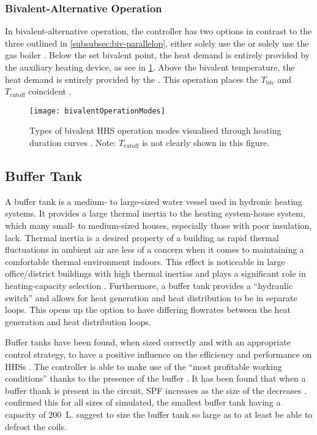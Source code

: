 \subsubsection{Bivalent-Alternative Operation}
In bivalent-alternative operation, the controller has two options in contrast to the three outlined in \cref{subsubsec:biv-parallelop}, either solely use the \HP or solely use the gas boiler \cite{buday_2014}. Below the set bivalent point, the heat demand is entirely provided by the auxiliary heating device, as see in \cref{fig:bivalentOperationModes}. Above the bivalent temperature, the heat demand is entirely provided by the \HP. This operation places the $T_\text{biv}$ and $T_\text{cutoff}$ coincident \cite{buday_2014,klein_numerical_2014}. 

\begin{figure}[htb]
    \centering
    \texttt{[image: bivalentOperationModes]}
    \caption[Bivalent operation modes]{Types of bivalent \ac{HHS} operation modes visualised through heating duration curves \cite{buday_2014}. Note: $T_\text{cutoff}$ is not clearly shown in this figure.}
    \label{fig:bivalentOperationModes}
\end{figure}

\subsection{Buffer Tank} 
A buffer tank is a medium- to large-sized water vessel used in hydronic heating systems. It provides a large thermal inertia to the heating system-house system, which many small- to medium-sized houses, especially those with poor insulation, lack. Thermal inertia is a desired property of a building as rapid thermal fluctuations in ambient air are less of a concern when it comes to maintaining a comfortable thermal environment indoors. This effect is noticeable in large office/district buildings with high thermal inertias and plays a significant role in heating-capacity selection \cite{owen_ashrae_2009}. Furthermore, a buffer tank provides a ``hydraulic switch'' and allows for heat generation and heat distribution to be in separate loops. This opens up the option to have differing flowrates between the heat generation and heat distribution loops. 

Buffer tanks have been found, when sized correctly and with an appropriate control strategy, to have a positive influence on the efficiency and performance on \acp{HHS} \cite{klein_numerical_2014,roccatello_analysis_2022}. The controller is able to make use of the \HPs ``most profitable working conditions'' thanks to the presence of the buffer \cite{dettorre_economic_2018}. It has been found that when a buffer thank is present in the \HP circuit, \ac{SPF} increases as the size of the \HP decreases \cite{mugnini_variable-load_2021}. \citeauthor{mugnini_variable-load_2021} \cite{mugnini_variable-load_2021} confirmed this for all sizes of \HPs simulated, the smallest buffer tank having a capacity of \SI{200}{\liter}.  \cite{STIEBEL_2012} suggest to size the buffer tank so large as to at least be able to defrost the coils.

